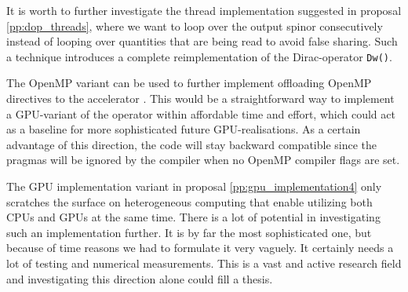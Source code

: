 \documentclass{article}
\theoremstyle{plain} %
\theoremstyle{convention} %
\theoremstyle{remark} %
\def\code#1{\texttt{#1}}
\numberwithin{equation}{section}
\begin{document}
It is worth to further investigate the thread implementation suggested in proposal \ref{pp:dop_threads}, where we want to loop over the output spinor consecutively instead of looping over quantities that are being read to avoid false sharing. Such a technique introduces a complete reimplementation of the Dirac-operator \code{Dw()}.

The OpenMP variant can be used to further implement offloading OpenMP directives to the accelerator \cite{omp_offloading}. This would be a straightforward way to implement a GPU-variant of the operator within affordable time and effort, which could act as a baseline for more sophisticated future GPU-realisations. As a certain advantage of this direction, the code will stay backward compatible since the pragmas will be ignored by the compiler when no OpenMP compiler flags are set.

The GPU implementation variant in proposal \ref{pp:gpu_implementation4} only scratches the surface on heterogeneous computing that enable utilizing both CPUs and GPUs at the same time. There is a lot of potential in investigating such an implementation further. It is by far the most sophisticated one, but because of time reasons we had to formulate it very vaguely. It certainly needs a lot of testing and numerical measurements. This is a vast and active research field and investigating this direction alone could fill a thesis.

\end{document}
